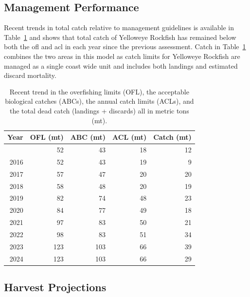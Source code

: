 \documentclass[
  english,
]{article}
\begin{document}
\endgroup

\clearpage

\subsection*{Management Performance}\label{management-performance}

Recent trends in total catch relative to management guidelines is
available in Table~\ref{tbl-es-management} and shows that total catch of
Yelloweye Rockfish has remained below both the \gls{ofl} and \gls{acl}
in each year since the previous assessment. Catch in
Table~\ref{tbl-es-management} combines the two areas in this model as
catch limits for Yelloweye Rockfish are managed as a single coast wide
unit and includes both landings and estimated discard mortality.

\begingroup
\fontsize{9.0pt}{11.0pt}\selectfont

\begin{longtable}{rrrrr}

\caption{\label{tbl-es-management}Recent trend in the overfishing limits
(OFL), the acceptable biological catches (ABCs), the annual catch limits
(ACLs), and the total dead catch (landings + discards) all in metric
tons (mt).}

\tabularnewline

\toprule
Year & OFL (mt) & ABC (mt) & ACL (mt) & Catch (mt) \\ 
\midrule\addlinespace[2.5pt]
2015 & 52 & 43 & 18 & 12 \\ 
2016 & 52 & 43 & 19 & 9 \\ 
2017 & 57 & 47 & 20 & 20 \\ 
2018 & 58 & 48 & 20 & 19 \\ 
2019 & 82 & 74 & 48 & 23 \\ 
2020 & 84 & 77 & 49 & 18 \\ 
2021 & 97 & 83 & 50 & 21 \\ 
2022 & 98 & 83 & 51 & 34 \\ 
2023 & 123 & 103 & 66 & 39 \\ 
2024 & 123 & 103 & 66 & 29 \\ 
\bottomrule

\end{longtable}

\endgroup

\subsection*{Harvest Projections}\label{harvest-projections}
\end{document}

